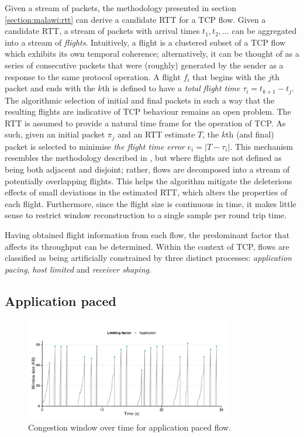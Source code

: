 Given a stream of packets, the methodology presented in section \ref{section:malawi:rtt} can derive a candidate \ac{RTT} for a \ac{TCP} flow.
Given a candidate \ac{RTT}, a stream of packets with arrival times $t_1, t_2, \ldots$ can be aggregated into a stream of \emph{flights}. 
Intuitively, a flight is a clustered subset of a \ac{TCP} flow which exhibits its own temporal coherence; alternatively, it can be thought of as a series of consecutive packets that were (roughly) generated by the sender as a response to the same protocol operation. 
A flight $f_i$ that begins with the $j$th packet and ends with the $k$th is defined to have a \emph{total flight time} $\tau_i = t_{k+1} - t_j$. 
The algorithmic selection of initial and final packets in such a way that the resulting flights are indicative of \ac{TCP} behaviour remains an open problem. 
The \ac{RTT} is assumed to provide a natural time frame for the operation of \ac{TCP}.
As such, given an initial packet $\pi_j$ and an \ac{RTT} estimate $T$, the $k$th (and final) packet is selected to minimise \emph{the flight time error} $e_i = |T - \tau_i|$. 
This mechanism resembles the methodology described in \cite{Zhang:2002p85}, but where flights are not defined as being both adjacent and disjoint; rather, flows are decomposed into a stream of potentially overlapping flights. 
This helps the algorithm mitigate the deleterious effects of small deviations in the estimated \ac{RTT}, which alters the properties of each flight. 
Furthermore, since the flight size is continuous in time, it makes little sense to restrict window reconstruction to a single sample per round trip time.

Having obtained flight information from each flow, the predominant factor that affects its throughput can be determined.
Within the context of \ac{TCP}, flows are classified as being artificially constrained by three distinct processes: \emph{application pacing}, \emph{host limited} and \emph{receiver shaping}.


\subsection{Application paced}
\label{section:rate:app}

\begin{figure}
\centering
  \includegraphics[width=0.8\textwidth]{figures/malawi/youtube.pdf}
  \caption{Congestion window over time for application paced flow. \label{fig:youtube}}
\end{figure}


